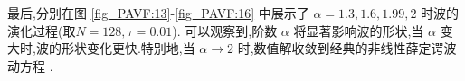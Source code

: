   最后,分别在图 \ref{fig_PAVF:13}-\ref{fig_PAVF:16} 中展示了 $\alpha=1.3,1.6,1.99,2$ 时波的演化过程(取$N=128, \tau=0.01$).
  可以观察到,阶数 $\alpha$ 将显著影响波的形状,当 $\alpha$ 变大时,波的形状变化更快.特别地,当 $\alpha \rightarrow 2$ 时,数值解收敛到经典的非线性薛定谔波动方程 \cite{zhangConservativeNumericalScheme2003,liCompactFiniteDifference2012,wangAnalysisNewConservative2006}.

  \begin{figure}[H]
	\begin{center}
	  \\
\end{center}
\end{figure}
